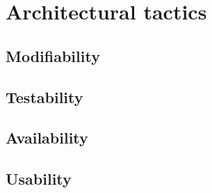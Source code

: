 \section{Architectural tactics} 


\subsection{Modifiability} %

\subsection{Testability} %

\subsection{Availability} %

\subsection{Usability} %